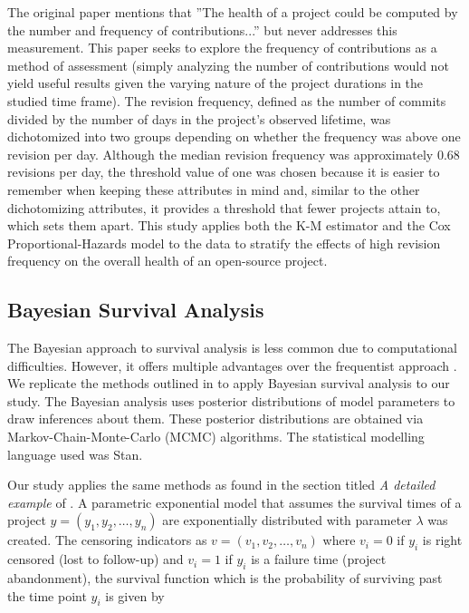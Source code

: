 \documentclass[acmconf]{acmart}
\begin{document}
The original paper mentions that ''The health of a project could be computed by the number and frequency of contributions...'' but never addresses this measurement.
This paper seeks to explore the frequency of contributions as a method of assessment (simply analyzing the number of contributions would not yield useful results given the varying nature of the project durations in the studied time frame). 
The revision frequency, defined as the number of commits divided by the number of days in the project's observed lifetime, was dichotomized into two groups depending on whether the frequency was above one revision per day.
Although the median revision frequency was approximately 0.68 revisions per day, the threshold value of one was chosen because it is easier to remember when keeping these attributes in mind and, similar to the other dichotomizing attributes, it provides a threshold that fewer projects attain to, which sets them apart.
This study applies both the K-M estimator and the Cox Proportional-Hazards model to the data to stratify the effects of high revision frequency on the overall health of an open-source project.

\subsection{Bayesian Survival Analysis}

The Bayesian approach to survival analysis is less common due to computational difficulties. However, it offers multiple advantages over the frequentist approach \cite{kelter2020bayesian}. 
We replicate the methods outlined in \cite{kelter2020bayesian} to apply Bayesian survival analysis to our study. 
The Bayesian analysis uses posterior distributions of model parameters to draw inferences about them. 
These posterior distributions are obtained via Markov-Chain-Monte-Carlo (MCMC) algorithms. 
The statistical modelling language used was Stan.

Our study applies the same methods as found in the section titled \emph{A detailed example} of \cite{kelter2020bayesian}. A parametric exponential model that assumes the survival times of a project $y = (y_1, y_2, \dots, y_n)$ are exponentially distributed with parameter $\lambda$ was created. 
The censoring indicators as $v = (v_1, v_2,\dots, v_n)$ where $v_i = 0$ if $y_i$ is right censored (lost to follow-up) and $v_i = 1$ if $y_i$ is a failure time (project abandonment), the survival function which is the probability of surviving past the time point $y_i$ is given by
\end{document}
